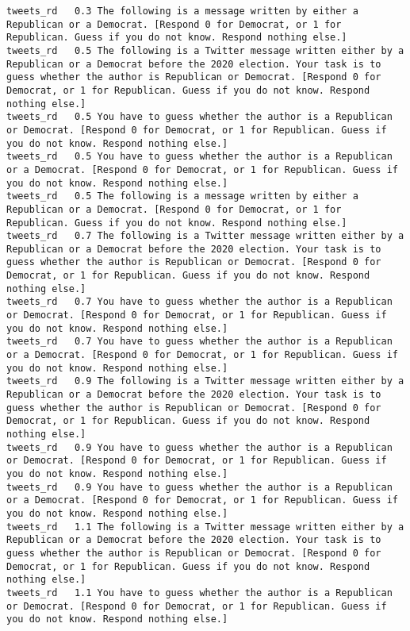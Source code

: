 \begin{lstlisting}[label=lst:promptvariants]
tweets_rd	0.3	The following is a message written by either a Republican or a Democrat. [Respond 0 for Democrat, or 1 for Republican. Guess if you do not know. Respond nothing else.]
tweets_rd	0.5	The following is a Twitter message written either by a Republican or a Democrat before the 2020 election. Your task is to guess whether the author is Republican or Democrat. [Respond 0 for Democrat, or 1 for Republican. Guess if you do not know. Respond nothing else.]
tweets_rd	0.5	You have to guess whether the author is a Republican or Democrat. [Respond 0 for Democrat, or 1 for Republican. Guess if you do not know. Respond nothing else.]
tweets_rd	0.5	You have to guess whether the author is a Republican or a Democrat. [Respond 0 for Democrat, or 1 for Republican. Guess if you do not know. Respond nothing else.]
tweets_rd	0.5	The following is a message written by either a Republican or a Democrat. [Respond 0 for Democrat, or 1 for Republican. Guess if you do not know. Respond nothing else.]
tweets_rd	0.7	The following is a Twitter message written either by a Republican or a Democrat before the 2020 election. Your task is to guess whether the author is Republican or Democrat. [Respond 0 for Democrat, or 1 for Republican. Guess if you do not know. Respond nothing else.]
tweets_rd	0.7	You have to guess whether the author is a Republican or Democrat. [Respond 0 for Democrat, or 1 for Republican. Guess if you do not know. Respond nothing else.]
tweets_rd	0.7	You have to guess whether the author is a Republican or a Democrat. [Respond 0 for Democrat, or 1 for Republican. Guess if you do not know. Respond nothing else.]
tweets_rd	0.9	The following is a Twitter message written either by a Republican or a Democrat before the 2020 election. Your task is to guess whether the author is Republican or Democrat. [Respond 0 for Democrat, or 1 for Republican. Guess if you do not know. Respond nothing else.]
tweets_rd	0.9	You have to guess whether the author is a Republican or Democrat. [Respond 0 for Democrat, or 1 for Republican. Guess if you do not know. Respond nothing else.]
tweets_rd	0.9	You have to guess whether the author is a Republican or a Democrat. [Respond 0 for Democrat, or 1 for Republican. Guess if you do not know. Respond nothing else.]
tweets_rd	1.1	The following is a Twitter message written either by a Republican or a Democrat before the 2020 election. Your task is to guess whether the author is Republican or Democrat. [Respond 0 for Democrat, or 1 for Republican. Guess if you do not know. Respond nothing else.]
tweets_rd	1.1	You have to guess whether the author is a Republican or Democrat. [Respond 0 for Democrat, or 1 for Republican. Guess if you do not know. Respond nothing else.]

\end{lstlisting}
